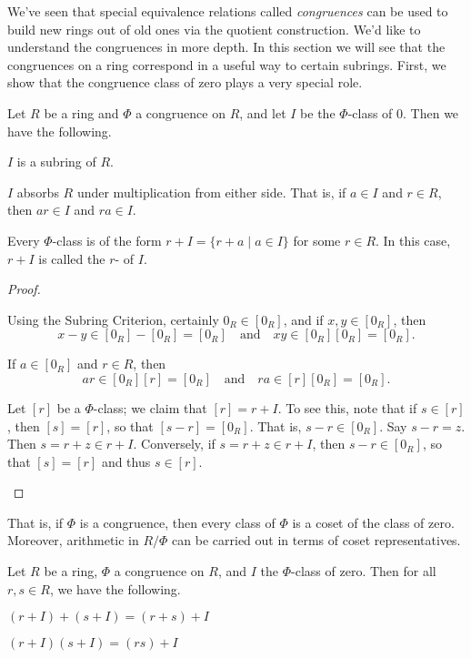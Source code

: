 We've seen that special equivalence relations called \emph{congruences} can be used to build new rings out of old ones via the quotient construction. We'd like to understand the congruences in more depth. In this section we will see that the congruences on a ring correspond in a useful way to certain subrings. First, we show that the congruence class of zero plays a very special role.

\begin{prop}
Let \(R\) be a ring and \(\Phi\) a congruence on \(R\), and let \(I\) be the \(\Phi\)-class of 0. Then we have the following.
\begin{proplist}
\item \(I\) is a subring of \(R\).
\item \(I\) absorbs \(R\) under multiplication from either side. That is, if \(a \in I\) and \(r \in R\), then \(ar \in I\) and \(ra \in I\).
\item Every \(\Phi\)-class is of the form \(r + I = \{ r+a \mid a \in I \}\) for some \(r \in R\). In this case, \(r+I\) is called the \(r\)- of \(I\).
\end{proplist}
\end{prop}

\begin{proof}
\begin{inlineproplist}
\item Using the Subring Criterion, certainly \(0_R \in [0_R]\), and if \(x,y \in [0_R]\), then \[ x-y \in [0_R] - [0_R] = [0_R] \quad \mathrm{and} \quad xy \in [0_R][0_R] = [0_R]. \]
\item If \(a \in [0_R]\) and \(r \in R\), then \[ ar \in [0_R][r] = [0_R] \quad \mathrm{and} \quad ra \in [r][0_R] = [0_R]. \]
\item Let \([r]\) be a \(\Phi\)-class; we claim that \([r] = r + I\). To see this, note that if \(s \in [r]\), then \([s] = [r]\), so that \([s-r] = [0_R]\). That is, \(s-r \in [0_R]\). Say \(s-r = z\). Then \(s = r+z \in r+I\). Conversely, if \(s = r+z \in r+I\), then \(s-r \in [0_R]\), so that \([s] = [r]\) and thus \(s \in [r]\).
\end{inlineproplist}
\end{proof}

That is, if \(\Phi\) is a congruence, then every class of \(\Phi\) is a coset of the class of zero. Moreover, arithmetic in \(R/\Phi\) can be carried out in terms of coset representatives.

\begin{prop}
Let \(R\) be a ring, \(\Phi\) a congruence on \(R\), and \(I\) the \(\Phi\)-class of zero. Then for all \(r,s \in R\), we have the following.
\begin{proplist}
\item \((r+I)+(s+I) = (r+s)+I\)
\item \((r+I) (s+I) = (r s)+I\)
\end{proplist}
\end{prop}

